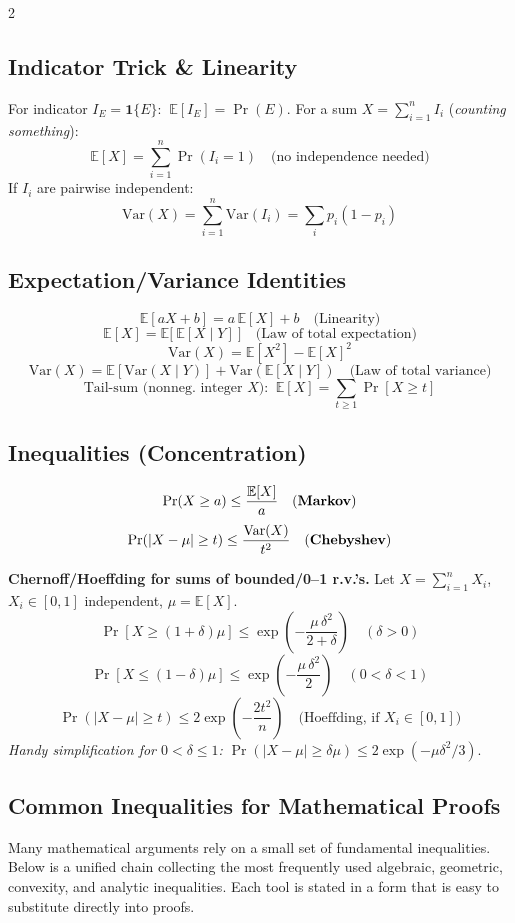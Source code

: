 \documentclass[8pt]{extarticle}
\theoremstyle{definition}
\begin{document}
\begin{multicols*}{2}
\subsection{Indicator Trick \& Linearity}
For indicator $I_E=\mathbf{1}\{E\}$: $\ \mathbb{E}[I_E]=\Pr(E)$.
For a sum $X=\sum_{i=1}^n I_i$ (\emph{counting something}):
\[
\mathbb{E}[X]=\sum_{i=1}^n \Pr(I_i=1)\quad\text{(no independence needed)}
\]
If $I_i$ are pairwise independent: 
\[
\mathrm{Var}(X)=\sum_{i=1}^n \mathrm{Var}(I_i)=\sum_i p_i(1-p_i)
\]

\subsection{Expectation/Variance Identities}
\[
\mathbb{E}[aX+b]=a\,\mathbb{E}[X]+b\quad\text{(Linearity)}
\]
\[
\mathbb{E}[X]=\mathbb{E}\big[\ \mathbb{E}[X\mid Y]\ \big]\quad\text{(Law of total expectation)}
\]
\[
\mathrm{Var}(X)=\mathbb{E}[X^2]-\mathbb{E}[X]^2
\]
\[
\mathrm{Var}(X)=\mathbb{E}\!\left[\mathrm{Var}(X\mid Y)\right]+\mathrm{Var}\!\left(\mathbb{E}[X\mid Y]\right)\quad\text{(Law of total variance)}
\]
\[
\text{Tail-sum (nonneg. integer $X$): }\ \mathbb{E}[X]=\sum_{t\ge1}\Pr[X\ge t]
\]

\subsection{Inequalities (Concentration)}
\[
\Pr(X\ge a)\le \frac{\mathbb{E}[X]}{a}\quad\text{(\textbf{Markov})}
\]
\[
\Pr(|X-\mu|\ge t)\le \frac{\mathrm{Var}(X)}{t^2}\quad\text{(\textbf{Chebyshev})}
\]

\noindent\textbf{Chernoff/Hoeffding for sums of bounded/0--1 r.v.'s.} Let $X=\sum_{i=1}^n X_i$, $X_i\in[0,1]$ independent, $\mu=\mathbb{E}[X]$.
\[
\Pr\!\left[X\ge (1+\delta)\mu\right]\le \exp\!\left(-\frac{\mu\,\delta^2}{2+\delta}\right)\quad(\delta>0)
\]
\[
\Pr\!\left[X\le (1-\delta)\mu\right]\le \exp\!\left(-\frac{\mu\,\delta^2}{2}\right)\quad(0<\delta<1)
\]
\[
\Pr(|X-\mu|\ge t)\le 2\exp\!\left(-\frac{2t^2}{n}\right)\quad\text{(Hoeffding, if $X_i\in[0,1]$)}
\]
\emph{Handy simplification for $0<\delta\le1$: } $\Pr(|X-\mu|\ge \delta\mu)\le 2\exp(-\mu\delta^2/3)$.
\subsection{Common Inequalities for Mathematical Proofs}
Many mathematical arguments rely on a small set of fundamental inequalities.
Below is a unified chain collecting the most frequently used algebraic,
geometric, convexity, and analytic inequalities.  Each tool is stated in a form
that is easy to substitute directly into proofs.

\end{multicols*}
\end{document}
